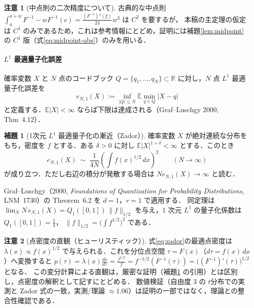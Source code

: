 \documentclass[a4paper,10pt]{jsarticle}
\makeatletter
\theoremstyle{definition}
\newtheorem{lemma}{補題}[section]
\newtheorem{remark}{注意}[section]
\renewenvironment{proof}[1][\proofname]{\par
  \pushQED{\qed}%
  \normalfont \topsep6\p@\@plus6\p@\relax
  \trivlist
  \item[\hskip\labelsep\textbf{#1}]\ignorespaces
}{%
  \popQED\endtrivlist\@endpefalse
}
\renewcommand{\proofname}{証明}
\newcommand{\Finv}{F^{-1}}
\newcommand{\R}{\mathbb{R}}
\newcommand{\E}{\mathbb{E}}
\newcommand{\eN}{e_{N,1}}
\makeatother
\begin{document}
\begin{remark}[中点則の二次精度について]
古典的な中点則 $\int_a^{a+w}\Finv-w\Finv(c)=\frac{(\Finv)''(\xi)}{24}w^3$ は $C^2$ を要するが，
本稿の主定理の仮定は $C^1$ のみであるため，これは参考情報にとどめ，証明には補題\ref{lem:midpoint} の $C^1$ 版（式\eqref{eq:midpoint-abs}）のみを用いる．
\end{remark}

\paragraph{$L^1$ 最適量子化誤差}
確率変数 $X$ と $N$ 点のコードブック $Q=\{q_1,\dots,q_N\}\subset\R$ に対し，$N$ 点 $L^1$ 最適量子化誤差を
\begin{equation}
  \eN(X):=\inf_{|Q|\le N}\E\min_{q\in Q}|X-q|
  \label{eq:def-eN}
\end{equation}
と定義する．$\E|X|<\infty$ ならば下限は達成される（Graf--Luschgy 2000, Thm~4.12）．

\begin{lemma}[1次元 $L^1$ 最適量子化の漸近（Zador）]
\label{lem:zador}
確率変数 $X$ が絶対連続な分布をもち，密度を $f$ とする．ある $\delta>0$ に対し $\E|X|^{1+\delta}<\infty$ とする．このとき
\begin{equation}
  \eN(X)\;\sim\;\frac1{4N}\left(\int f(x)^{1/2}\,dx\right)^{2}
  \qquad(N\to\infty)
  \label{eq:zador}
\end{equation}
が成り立つ．ただし右辺の積分が発散する場合は $N\eN(X)\to\infty$ と読む．
\end{lemma}
\begin{proof}
Graf--Luschgy（2000, \textit{Foundations of Quantization for Probability Distributions}, LNM~1730）の Theorem~6.2 を $d=1$，$r=1$ で適用する．
同定理は $\lim_N N\,\eN(X)=Q_1([0,1])\,\|f\|_{1/2}$ を与え，$1$ 次元 $L^1$ の量子化係数は $Q_1([0,1])=\tfrac14$，
$\|f\|_{1/2}=\bigl(\int f^{1/2}\bigr)^2$ である．
\end{proof}

\begin{remark}[点密度の直観（ヒューリスティック）]
\label{rem:zador-heuristic}
式\eqref{eq:zador}の最適点密度は $\lambda(x)\propto f(x)^{1/2}$ で与えられる．これを分位点空間 $\tau=F(x)$（$d\tau=f(x)\,dx$）へ変換すると
$p(\tau)=\lambda(x)\frac{dx}{d\tau}=\frac{f^{1/2}}{f}=f^{-1/2}(\Finv(\tau))=\bigl((\Finv)'(\tau)\bigr)^{1/2}$ となる．
この変分計算による直観は，厳密な証明（補題\ref{lem:zador} の引用）とは区別し，点密度の解釈として記すにとどめる．
数値検証（自由度 $3$ の $t$分布での実測と Zador 式の一致，実測/理論 $\approx1.06$）は証明の一部ではなく，理論との整合性確認である．
\end{remark}
\end{document}
